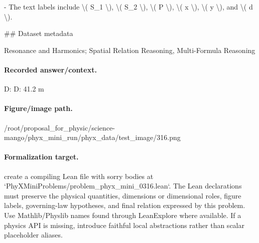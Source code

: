 - The text labels include \textbackslash{}( S\_1 \textbackslash{}), \textbackslash{}( S\_2 \textbackslash{}), \textbackslash{}( P \textbackslash{}), \textbackslash{}( x \textbackslash{}), \textbackslash{}( y \textbackslash{}), and \textbackslash{}( d \textbackslash{}).

\#\# Dataset metadata

Resonance and Harmonics; Spatial Relation Reasoning, Multi-Formula Reasoning

\paragraph{Recorded answer/context.}
D: D: 41.2 m

\paragraph{Figure/image path.}
/root/proposal\_for\_physic/science-mango/phyx\_mini\_run/phyx\_data/test\_image/316.png

\paragraph{Formalization target.}
create a compiling Lean file with sorry bodies at `PhyXMiniProblems/problem\_phyx\_mini\_0316.lean`. The Lean declarations must preserve the physical quantities, dimensions or dimensional roles, figure labels, governing-law hypotheses, and final relation expressed by this problem.
Use Mathlib/Physlib names found through LeanExplore where available. If a physics API is missing, introduce faithful local abstractions rather than scalar placeholder aliases.

